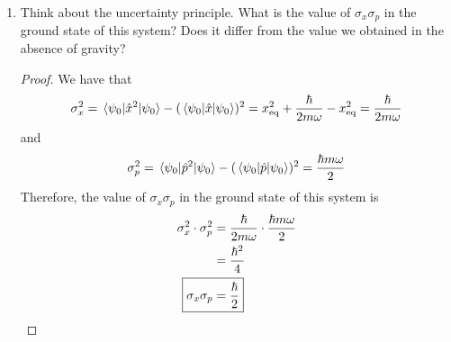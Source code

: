 \documentclass[../psets.tex]{subfiles}
\begin{document}
\begin{enumerate}
\begin{enumerate}
\begin{proof}
\begin{align*}
            \end{align*}
            The leftmost integral above evaluates to 1. The middle integral above evaluates to zero because its integrand is an odd function (the product of an odd and even function). The right integral expands to
            \begin{equation*}
                \int_{-\infty}^\infty u^2\left( \frac{m\omega}{\hbar\pi} \right)^{1/2}\e[-m\omega u^2/\hbar]\dd{u} = \frac{\hbar}{2m\omega}
            \end{equation*}
            upon plugging in the harmonic oscillator's ground state wave function, and may be evaluated using computational software. Thus, altogether,
            \begin{equation*}
                \boxed{\ev{\hat{x}^2}{\psi_0} = x_\text{eq}^2+\frac{\hbar}{2m\omega}}
            \end{equation*}
            Similar explicit computations for the mean value of $p^2$ yield
            \begin{equation*}
                \boxed{\ev{\hat{p}^2}{\psi_0} = \frac{\hbar m\omega}{2}}
            \end{equation*}
        \end{proof}
        \item Think about the uncertainty principle. What is the value of $\sigma_x\sigma_p$ in the ground state of this system? Does it differ from the value we obtained in the absence of gravity?
        \begin{proof}
            We have that
            \begin{equation*}
                \sigma_x^2 = \ev{\hat{x}^2}{\psi_0}-(\ev{\hat{x}}{\psi_0})^2
                = x_\text{eq}^2+\frac{\hbar}{2m\omega}-x_\text{eq}^2
                = \frac{\hbar}{2m\omega}
            \end{equation*}
            and
            \begin{equation*}
                \sigma_p^2 = \ev{\hat{p}^2}{\psi_0}-(\ev{\hat{p}}{\psi_0})^2
                = \frac{\hbar m\omega}{2}
            \end{equation*}
            Therefore, the value of $\sigma_x\sigma_p$ in the ground state of this system is
            \begin{align*}
                \sigma_x^2\cdot\sigma_p^2 &= \frac{\hbar}{2m\omega}\cdot\frac{\hbar m\omega}{2}\\
                &= \frac{\hbar^2}{4}\\
                \Aboxed{\sigma_x\sigma_p &= \frac{\hbar}{2}}

\end{align*}
\end{proof}
\end{enumerate}
\end{enumerate}
\end{document}

